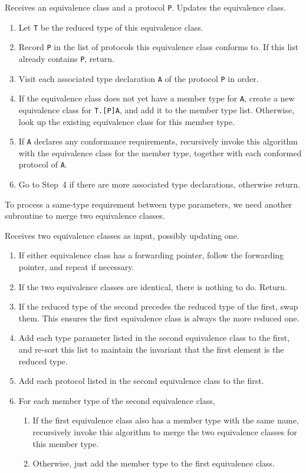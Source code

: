 \documentclass[../generics]{subfiles}
\begin{document}
\begin{algorithm}\label{archetype builder expand}
Receives an equivalence class and a protocol \texttt{P}. Updates the equivalence class.
\begin{enumerate}
\item Let \texttt{T} be the reduced type of this equivalence class.
\item Record \texttt{P} in the list of protocols this equivalence class conforms to. If this list already contains \texttt{P}, return.
\item Visit each associated type declaration \texttt{A} of the protocol \texttt{P} in order.
\item If the equivalence class does not yet have a member type for \texttt{A}, create a new equivalence class for \texttt{T.[P]A}, and add it to the member type list. Otherwise, look up the existing equivalence class for this member type.
\item If \texttt{A} declares any conformance requirements, recursively invoke this algorithm with the equivalence class for the member type, together with each conformed protocol of \texttt{A}.
\item Go to Step~4 if there are more associated type declarations, otherwise return.
\end{enumerate}
\end{algorithm}
To process a same-type requirement between type parameters, we need another subroutine to merge two equivalence classes.
\begin{algorithm}\label{archetype builder merge}
Receives two equivalence classes as input, possibly updating one.
\begin{enumerate}
\item If either equivalence class has a forwarding pointer, follow the forwarding pointer, and repeat if necessary.
\item If the two equivalence classes are identical, there is nothing to do. Return.
\item If the reduced type of the second precedes the reduced type of the first, swap them. This ensures the first equivalence class is always the more reduced one.
\item Add each type parameter listed in the second equivalence class to the first, and re-sort this list to maintain the invariant that the first element is the reduced type.
\item Add each protocol listed in the second equivalence class to the first.
\item For each member type of the second equivalence class,
\begin{enumerate}
\item If the first equivalence class also has a member type with the same name, recursively invoke this algorithm to merge the two equivalence classes for this member type.
\item Otherwise, just add the member type to the first equivalence class.
\end{enumerate}
\end{enumerate}
\end{algorithm}
\end{document}
